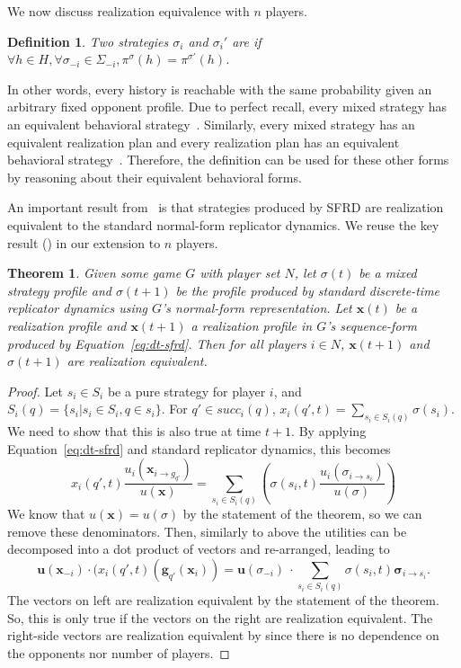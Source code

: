\documentclass{aamas2014}
\newcommand{\bx}{\mathbf{x}}
\newcommand{\bg}{\mathbf{g}}
\newcommand{\bu}{\mathbf{u}}
\newcommand{\defword}[1]{\textbf{\boldmath{#1}}}
\newtheorem{definition}{Definition}
\newtheorem{theorem}{Theorem}
\newcommand{\todo}[1]{{\color{red}{\bf #1}}}
\begin{document}
\noindent We now discuss realization equivalence with $n$ players. 
\begin{definition}
Two strategies $\sigma_i$ and $\sigma_i'$ are \defword{realization equivalent} if 
$\forall h \in H, \forall \sigma_{-i} \in \Sigma_{-i}, \pi^{\sigma}(h) = \pi^{\sigma'}(h)$. 
\end{definition}
In other words, every history is reachable with the same probability given an arbitrary fixed opponent profile. 
Due to perfect recall, every mixed strategy has an equivalent behavioral strategy~\cite{Kuhn53}. 
Similarly, every mixed strategy has an equivalent realization plan and every realization plan has 
an equivalent behavioral strategy~\cite{SequenceFormLPs}. Therefore, the definition can be used for these 
other forms by reasoning about their equivalent behavioral forms. 

An important result from~\cite{Gatti13Efficient} is that strategies produced by SFRD are realization equivalent 
to the standard normal-form replicator dynamics. We reuse the key result (\cite[Lemma 9]{Gatti13Efficient}) 
in our extension to $n$ players.

\begin{theorem}
Given some game $G$ with player set $N$, 
let $\sigma(t)$ be a mixed strategy profile and $\sigma(t+1)$ be the profile produced by 
standard discrete-time replicator dynamics using $G$'s normal-form representation. 
Let $\bx(t)$ be a realization profile and $\bx(t+1)$ a realization profile in $G$'s sequence-form produced by 
Equation~\ref{eq:dt-sfrd}. Then for all players $i \in N$, $\bx(t+1)$ and $\sigma(t+1)$ are realization equivalent.
\end{theorem}
\begin{proof}
Let $s_i \in S_i$ be a pure strategy for player $i$, and $S_i(q) = \{ s_i | s_i \in S_i, q \in s_i \}$.
For $q' \in succ_i(q)$, $x_i(q', t) = \sum_{s_i \in S_i(q)} \sigma(s_i)$. 
We need to show that this is also true at time $t+1$. By applying Equation~\ref{eq:dt-sfrd} and standard
replicator dynamics, this becomes
\[
  x_i(q',t) \frac{u_i(\bx_{i \rightarrow g_{q'}})}{u(\bx)} 
= \sum_{s_i \in S_i(q)} \left( \sigma(s_i,t) \frac{u_i(\sigma_{i \rightarrow s_i})}{u(\sigma)} \right)
\]
We know that $u(\bx) = u(\sigma)$ by the statement of the theorem, so we can remove these denominators.
Then, similarly to above the utilities can be decomposed into a dot product of vectors and re-arranged, leading to
\[
  \bu(\bx_{-i}) \cdot (x_i(q',t)(\bg_{q'}(\bx_i)) 
= \bu(\sigma_{-i})~\cdot \sum_{s_i \in S_i(q)} \sigma(s_i,t) \boldsymbol\sigma_{i \rightarrow s_i}.
\]
\noindent The vectors on left are realization equivalent by the statement of the theorem. So, this 
is only true if the vectors on the right are realization equivalent. The right-side vectors are realization equivalent 
by \cite[Lemma 9]{Gatti13Efficient} since there is no dependence on the opponents nor number of players. 

\todo{check over this proof again}
\end{proof}
\end{document}
